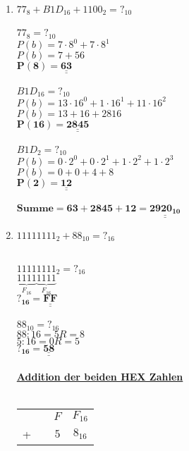 \documentclass[a4paper,10pt]{article}
\def\doubleunderline#1{\underline{\underline{#1}}}
\begin{document}
\begin{enumerate}
\item $77_{8} + B1D_{16} + 1100_{2} = ?_{10}$ \\ \\ %
	 {\color{ForestGreen}
	 	 $77_{8} = ?_{10}$ \\
		 $P(b)= 7 \cdot 8^0 + 7 \cdot 8^1$ \\
		 $P(b)= 7 + 56 $ \\
		 $\mathbf{P(8)= \doubleunderline{63}}$ \\
		 \\
	 	 $B1D_{16} = ?_{10}$ \\
		 $P(b)= 13 \cdot 16^0 + 1 \cdot 16^1 + 11 \cdot 16^2$ \\
		 $P(b)= 13 + 16 + 2816 $ \\
		 $\mathbf{P(16)= \doubleunderline{2845}}$ \\	
		 \\
	 	 $B1D_{2} = ?_{10}$ \\
		 $P(b)= 0 \cdot 2^0 + 0 \cdot 2^1 + 1 \cdot 2^2 + 1 \cdot 2^3$ \\
		 $P(b)= 0 + 0 + 4 + 8 $ \\
		 $\mathbf{P(2)= \doubleunderline{12}}$ \\		
		 \\
		 $\mathbf{Summe = 63 + 2845 + 12 = \doubleunderline{2920_{10}}}$ 
	 }
\item $11111111_{2} + 88_{10} = ?_{16}$  \\     \\    %
	 {\color{ForestGreen}
	 	 $11111111_{2} = ?_{16}$ \\
		 $\underbrace{1111}_\text{$F_{16}$}\underbrace{1111}_\text{$F_{16}$}$ \\
		 $\mathbf{?_{16} = \doubleunderline{FF}}$ \\
		 \\
		 $88_{10} = ?_{16}$ \\
		 $88 : 16 = 5 R=8$  \\
		 $5 : 16 = 0 R=5$ \\
		 $\mathbf{?_{16} = \doubleunderline{58}}$ \\
		 \\
		 \textbf{\underline{Addition der beiden HEX Zahlen}} \\
		 \\
		 \begin{tabular}{c@{\,}c@{\,}c@{\,}c}
		  &  & $F$ & $F_{16}$ \\
		+ &   & $5$ & $8_{16}$ \\

\end{tabular}}
\end{enumerate}
\end{document}
